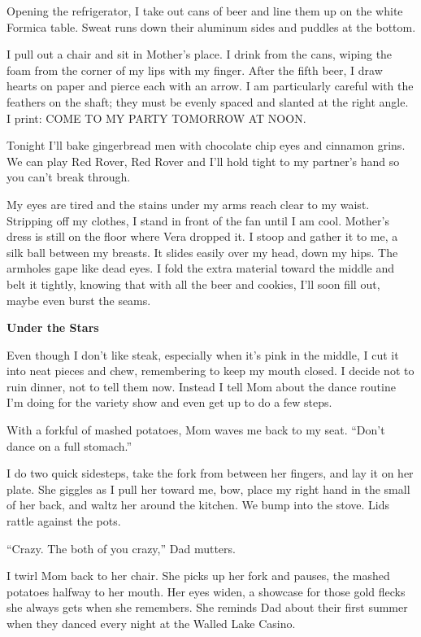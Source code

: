 \documentclass[
]{article}
\begin{document}
Opening the refrigerator, I take out cans of beer and line them up on
the white Formica table. Sweat runs down their aluminum sides and
puddles at the bottom.

I pull out a chair and sit in Mother's place. I drink from the cans,
wiping the foam from the corner of my lips with my finger. After the
fifth beer, I draw hearts on paper and pierce each with an arrow. I am
particularly careful with the feathers on the shaft; they must be evenly
spaced and slanted at the right angle. I print: COME TO MY PARTY
TOMORROW AT NOON.

Tonight I'll bake gingerbread men with chocolate chip eyes and cinnamon
grins. We can play Red Rover, Red Rover and I'll hold tight to my
partner's hand so you can't break through.

My eyes are tired and the stains under my arms reach clear to my waist.
Stripping off my clothes, I stand in front of the fan until I am cool.
Mother's dress is still on the floor where Vera dropped it. I stoop and
gather it to me, a silk ball between my breasts. It slides easily over
my head, down my hips. The armholes gape like dead eyes. I fold the
extra material toward the middle and belt it tightly, knowing that with
all the beer and cookies, I'll soon fill out, maybe even burst the
seams.

\textbf{Under the Stars}

Even though I don't like steak, especially when it's pink in the middle,
I cut it into neat pieces and chew, remembering to keep my mouth closed.
I decide not to ruin dinner, not to tell them now. Instead I tell Mom
about the dance routine I'm doing for the variety show and even get up
to do a few steps.

With a forkful of mashed potatoes, Mom waves me back to my seat. ``Don't
dance on a full stomach.''

I do two quick sidesteps, take the fork from between her fingers, and
lay it on her plate. She giggles as I pull her toward me, bow, place my
right hand in the small of her back, and waltz her around the kitchen.
We bump into the stove. Lids rattle against the pots.

``Crazy. The both of you crazy,'' Dad mutters.

I twirl Mom back to her chair. She picks up her fork and pauses, the
mashed potatoes halfway to her mouth. Her eyes widen, a showcase for
those gold flecks she always gets when she remembers. She reminds Dad
about their first summer when they danced every night at the Walled Lake
Casino.
\end{document}
